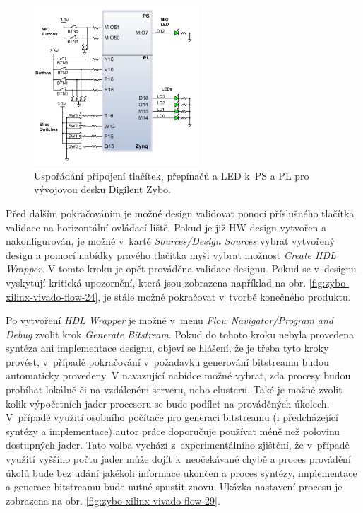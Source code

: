 \documentclass[a4paper, twoside, 11pt]{article}
\begin{document}
\begin{appendices}
		\begin{figure}[htbp!]
			\centering
			\includegraphics[width=0.55\textwidth]{src/png/digilent-zybo-ps-pl-gpio.png}
			\caption{Uspořádání připojení tlačítek, přepínačů a LED k~PS a PL pro vývojovou desku Digilent Zybo. \cite{digilent-zybo-reference-manual}}
			\label{fig:digilent-zybo-ps-pl-gpio}
		\end{figure}


		Před dalším pokračováním je možné design validovat ponocí příslušného tlačítka validace na horizontální ovládací liště. Pokud je již HW design vytvořen a nakonfigurován, je možné v~kartě \textit{Sources/Design Sources} vybrat vytvořený design a pomocí nabídky pravého tlačítka myši vybrat možnost \textit{Create HDL Wrapper}. V tomto kroku je opět prováděna validace designu. Pokud se v~designu vyskytují kritická upozornění, která jsou zobrazena například na obr. \ref{fig:zybo-xilinx-vivado-flow-24}, je stále možné pokračovat v~tvorbě konečného produktu.\par
		Po vytvoření \textit{HDL Wrapper} je možné v~menu \textit{Flow Navigator/Program and Debug} zvolit krok \textit{Generate Bitstream}. Pokud do tohoto kroku nebyla provedena syntéza ani implementace designu, objeví se hlášení, že je třeba tyto kroky provést, v~případě pokračování v~požadavku generování bitstreamu budou automaticky provedeny. V navazující nabídce možné vybrat, zda procesy budou probíhat lokálně či na vzdáleném serveru, nebo clusteru. Také je možné zvolit kolik výpočetních jader procesoru se bude podílet na prováděných úkolech. V~případě využití osobního počítače pro generaci bitstreamu (i předcházející syntézy a implementace) autor práce doporučuje používat méně než polovinu dostupných jader. Tato volba vychází z~experimentálního zjištění, že v~případě využití vyššího počtu jader může dojít k~neočekávané chybě a proces provádění úkolů bude bez udání jakékoli informace ukončen a proces syntézy, implementace a generace bitstreamu bude nutné spustit znovu. Ukázka nastavení procesu je zobrazena na obr. \ref{fig:zybo-xilinx-vivado-flow-29}.\par



\end{appendices}
\end{document}
